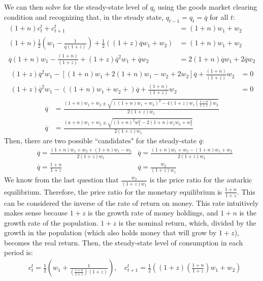\documentclass{article}
\newcommand{\olq}{\overline{q}}
\begin{document}
\begin{enumerate}
\begin{align*}
		\end{align*}
		We can then solve for the steady-state level of $q_t$ using the goods market clearing condition and recognizing that, in the steady state, $q_{t-1}=q_t=\overline{q}$ for all $t$:
		\begin{align*}
			(1+n)c_t^t + c_{t+1}^t &= (1+n)w_1 + w_2	\\
			(1+n)\frac{1}{2}\left(w_1 - \frac{1}{\olq(1+z)}\right) + \frac{1}{2}\left((1+z)\olq w_1 + w_2\right) &= (1+n)w_1 + w_2 \\
			\olq(1+n)w_1 - \frac{(1+n)}{(1+z)} + (1+z)\olq^2 w_1 + \olq w_2 &= 2(1+n)\olq w_1 + 2\olq w_2 
		\end{align*}
		\begin{align*}
			(1+z)\olq^2 w_1 - \left[(1+n)w_1 + 2(1+n) w_1 - w_2 + 2w_2 \right]\olq + \frac{(1+n)}{(1+z)}w_2  &= 0  \\
			(1+z)\olq^2 w_1 - \left((1+n)w_1 + w_2 + \right)\olq + \frac{(1+n)}{(1+z)}w_2  &= 0  
		\end{align*}
		\begin{align*}
			\olq &= \frac{(1+n)w_1+w_2\pm \sqrt{((1+n)w_1 + w_2)^2 - 4(1+z)w_1\left(\frac{1+n}{1+z}\right)w_2}}{2(1+z)w_1}	\\
			\olq &= \frac{(a+n)w_1+w_2\pm\sqrt{(1+n)^2w_1^2-2(1+n)w_1w_2+w_2^2}}{2(1+z)w_1}
		\end{align*}
		Then, there are two possible ``candidates" for the steady-state $\olq$:
		\begin{align*}
			&\olq = \frac{(1+n)w_1+w_2+(1+n)w_1-w_2}{2(1+z)w_1}	&\olq = \frac{(1+n)w_1+w_2-(1+n)w_1+w_2}{2(1+z)w_1}	\\
			&\olq = \frac{1+n}{1+z}								&\olq = \frac{w_2}{(1+z)w_1}
		\end{align*}
		We know from the last question that $\frac{w_2}{(1+z)w_1}$ is the price ratio for the autarkic equilibrium. Therefore, the price ratio for the monetary equilibrium is $\frac{1+n}{1+z}$. This can be considered the inverse of the rate of return on money. This rate intuitively makes sense because $1+z$ is the growth rate of money holdings, and $1+n$ is the growth rate of the population. $1+z$ is the nominal return, which, divided by the growth in the population (which also holds money that will grow by $1+z$), becomes the real return. Then, the steady-state level of consumption in each period is:
		\begin{align*}
			&c_t^t 		= \frac{1}{2}\left(w_1 + \frac{1}{\left(\frac{1+n}{1+z}\right)(1+z)}\right)\text{, }	& c_{t+1}^t = \frac{1}{2}\left((1+z)\left(\frac{1+n}{1+z}\right)w_1 + w_2\right) \\

\end{align*}
\end{enumerate}
\end{document}
